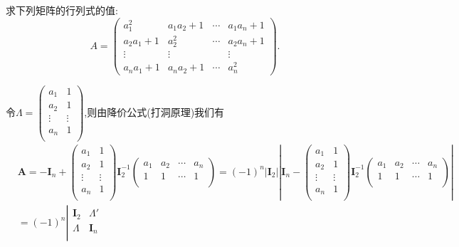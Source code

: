 \documentclass[lang=cn,newtx,10pt,scheme=chinese]{elegantbook}
\begin{document}
\begin{example}\label{example:1895}
求下列矩阵的行列式的值:
\[
A = 
\begin{pmatrix}
a_1^2 & a_1a_2 + 1 & \cdots & a_1a_n + 1\\
a_2a_1 + 1 & a_2^2 & \cdots & a_2a_n + 1\\
\vdots & \vdots & & \vdots\\
a_na_1 + 1 & a_na_2 + 1 & \cdots & a_n^2
\end{pmatrix}.
\]
\end{example}
\begin{solution}
令$\boldsymbol{\varLambda }=\left( \begin{matrix}
a_1&		1\\
a_2&		1\\
\vdots&		\vdots\\
a_n&		1\\
\end{matrix} \right)$,则由降价公式(打洞原理)我们有
\begin{align*}
&\boldsymbol{A}=-\boldsymbol{I}_n+\left( \begin{matrix}
a_1&		1\\
a_2&		1\\
\vdots&		\vdots\\
a_n&		1\\
\end{matrix} \right) \boldsymbol{I}_{2}^{-1}\left( \begin{matrix}
a_1&		a_2&		\cdots&		a_n\\
1&		1&		\cdots&		1\\
\end{matrix} \right) =\left( -1 \right) ^n\left| \boldsymbol{I}_2 \right|\left| \boldsymbol{I}_n-\left( \begin{matrix}
a_1&		1\\
a_2&		1\\
\vdots&		\vdots\\
a_n&		1\\
\end{matrix} \right) \boldsymbol{I}_{2}^{-1}\left( \begin{matrix}
a_1&		a_2&		\cdots&		a_n\\
1&		1&		\cdots&		1\\
\end{matrix} \right) \right|
\\
&=\left( -1 \right) ^n\left| \begin{matrix}
\boldsymbol{I}_2&		\boldsymbol{\varLambda }'\\
\boldsymbol{\varLambda }&		\boldsymbol{I}_n\\

\end{matrix}
\end{align*}
\end{solution}
\end{document}
